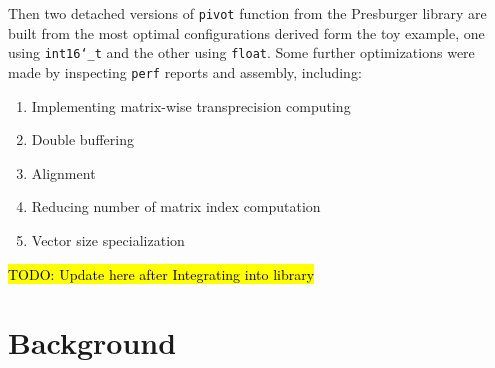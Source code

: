 \documentclass[logo,bsc,singlespacing,parskip]{infthesis}
\newcommand{\dtshort}{\texttt{int16\char`_t}}
\newcommand{\dtfloat}{\texttt{float}}
\newenvironment{compactlist}
{ \begin{enumerate}
    \setlength{\itemsep}{0pt}
    \setlength{\parskip}{0pt}
    \setlength{\parsep}{0pt}     
}
{ \end{enumerate} }
\begin{document}
Then two detached versions of \texttt{pivot} function from the Presburger
library are built from the most optimal configurations derived form the toy
example, one using \dtshort{} and the other using \dtfloat{}. Some
further optimizations were made by inspecting \texttt{perf} reports and
assembly, including: 

\begin{compactlist} 
    \item Implementing matrix-wise transprecision computing 
    \item Double buffering
    \item Alignment
    \item Reducing number of matrix index computation
    \item Vector size specialization
\end{compactlist}

\hl{TODO: Update here after Integrating into library}



\chapter{Background}
\end{document}
